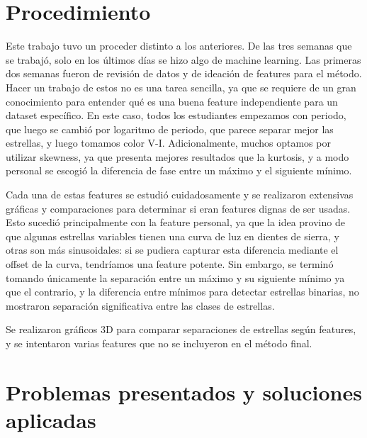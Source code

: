 \documentclass[10pt,twocolumn]{article}
\begin{document}
\section{Procedimiento}

Este trabajo tuvo un proceder distinto a los anteriores. De las tres semanas que se trabajó, solo en los últimos días se hizo algo de 
machine learning. Las primeras dos semanas fueron de revisión de datos y de ideación de features para el método. Hacer un trabajo de estos 
no es una tarea sencilla, ya que se requiere de un gran conocimiento para entender qué es una buena feature independiente para un 
dataset específico. En este caso, todos los estudiantes empezamos con periodo, que luego se cambió por logaritmo de periodo, que parece
separar mejor las estrellas, y luego tomamos color V-I. Adicionalmente, muchos optamos por utilizar skewness, ya que presenta 
mejores resultados que la kurtosis, y a modo personal se escogió la diferencia de fase entre un máximo y el siguiente mínimo. 

Cada una de estas features se estudió cuidadosamente y se realizaron extensivas gráficas y comparaciones para determinar si 
eran features dignas de ser usadas. Esto sucedió principalmente con la feature personal, ya que la idea provino de que algunas
estrellas variables tienen una curva de luz en dientes de sierra, y otras son más sinusoidales: si se pudiera capturar esta diferencia
mediante el offset de la curva, tendríamos una feature potente. Sin embargo, se terminó tomando únicamente la separación entre un 
máximo y su siguiente mínimo ya que el contrario, y la diferencia entre mínimos para detectar estrellas binarias, no mostraron separación
significativa entre las clases de estrellas.

Se realizaron gráficos 3D para comparar separaciones de estrellas según features, y se intentaron varias features que no se incluyeron en 
el método final. 

\section{Problemas presentados y soluciones aplicadas}
\end{document}
